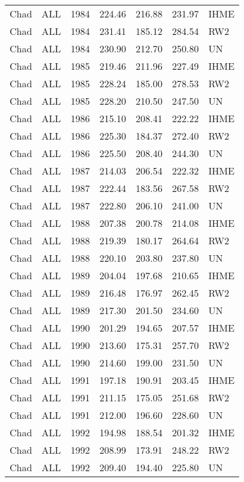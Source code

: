 \begin{longtable}{lllrrrl}
  Chad & ALL & 1984 & 224.46 & 216.88 & 231.97 & IHME \\ 
  Chad & ALL & 1984 & 231.41 & 185.12 & 284.54 & RW2 \\ 
  Chad & ALL & 1984 & 230.90 & 212.70 & 250.80 & UN \\ 
  Chad & ALL & 1985 & 219.46 & 211.96 & 227.49 & IHME \\ 
  Chad & ALL & 1985 & 228.24 & 185.00 & 278.53 & RW2 \\ 
  Chad & ALL & 1985 & 228.20 & 210.50 & 247.50 & UN \\ 
  Chad & ALL & 1986 & 215.10 & 208.41 & 222.22 & IHME \\ 
  Chad & ALL & 1986 & 225.30 & 184.37 & 272.40 & RW2 \\ 
  Chad & ALL & 1986 & 225.50 & 208.40 & 244.30 & UN \\ 
  Chad & ALL & 1987 & 214.03 & 206.54 & 222.32 & IHME \\ 
  Chad & ALL & 1987 & 222.44 & 183.56 & 267.58 & RW2 \\ 
  Chad & ALL & 1987 & 222.80 & 206.10 & 241.00 & UN \\ 
  Chad & ALL & 1988 & 207.38 & 200.78 & 214.08 & IHME \\ 
  Chad & ALL & 1988 & 219.39 & 180.17 & 264.64 & RW2 \\ 
  Chad & ALL & 1988 & 220.10 & 203.80 & 237.80 & UN \\ 
  Chad & ALL & 1989 & 204.04 & 197.68 & 210.65 & IHME \\ 
  Chad & ALL & 1989 & 216.48 & 176.97 & 262.45 & RW2 \\ 
  Chad & ALL & 1989 & 217.30 & 201.50 & 234.60 & UN \\ 
  Chad & ALL & 1990 & 201.29 & 194.65 & 207.57 & IHME \\ 
  Chad & ALL & 1990 & 213.60 & 175.31 & 257.70 & RW2 \\ 
  Chad & ALL & 1990 & 214.60 & 199.00 & 231.50 & UN \\ 
  Chad & ALL & 1991 & 197.18 & 190.91 & 203.45 & IHME \\ 
  Chad & ALL & 1991 & 211.15 & 175.05 & 251.68 & RW2 \\ 
  Chad & ALL & 1991 & 212.00 & 196.60 & 228.60 & UN \\ 
  Chad & ALL & 1992 & 194.98 & 188.54 & 201.32 & IHME \\ 
  Chad & ALL & 1992 & 208.99 & 173.91 & 248.22 & RW2 \\ 
  Chad & ALL & 1992 & 209.40 & 194.40 & 225.80 & UN \\ 

\end{longtable}
